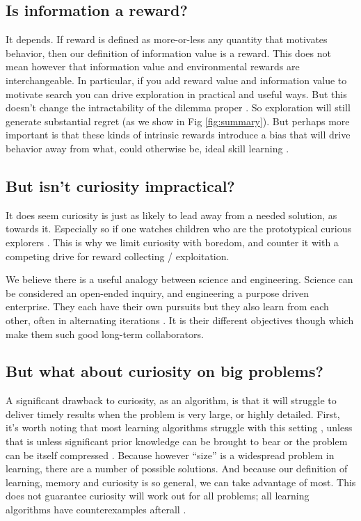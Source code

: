 \subsection*{Is information a reward?}
It depends. If reward is defined as more-or-less any quantity that motivates behavior, then our definition of information value is a reward. This does not mean however that information value and environmental rewards are interchangeable. In particular, if you add reward value and information value to motivate search you can drive exploration in practical and useful ways. But this doesn't change the intractability of the dilemma proper \cite{Thrun1992a,Dayan1996,Findling2018,Gershman2018b}. So exploration will still generate substantial regret (as we show in Fig \ref{fig:summary}). But perhaps more important is that these kinds of intrinsic rewards \cite{Schmidhuber1991,Berger-Tal2014,Itti2009,Friston2016,Kobayashi2019} introduce a bias that will drive behavior away from what, could otherwise be, ideal skill learning \cite{Ng1999,Simsek2006}.


\subsection*{But isn't curiosity impractical?}
It does seem curiosity is just as likely to lead away from a needed solution, as towards it. Especially so if one watches children who are the prototypical curious explorers \cite{Sumner2019,Kidd2015}. This is why we limit curiosity with boredom, and counter it with a competing drive for reward collecting / exploitation. 

We believe there is a useful analogy between science and engineering. Science can be considered an open-ended inquiry, and engineering a purpose driven enterprise. They each have their own pursuits but they also learn from each other, often in alternating iterations \cite{Gupta2006}. It is their different objectives though which make them such good long-term collaborators.


\subsection*{But what about curiosity on big problems?}
A significant drawback to curiosity, as an algorithm, is that it will struggle to deliver timely results when the problem is very large, or highly detailed. First, it's worth noting that most learning algorithms struggle with this setting \cite{MacKay2003,Sutton2018}, unless that is unless significant prior knowledge can be brought to bear \cite{Zhang2020,Sutton2018} or the problem can be itself compressed \cite{Ha2018a,Fister2019}. Because however ``size'' is a widespread problem in learning, there are a number of possible solutions. And because our definition of learning, memory and curiosity is so general, we can take advantage of most. This does not guarantee curiosity will work out for all problems; all learning algorithms have counterexamples afterall \cite{Wolpert1997}.


